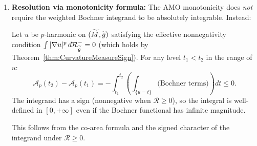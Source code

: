 \begin{enumerate}
\begin{itemize}
        Since $N(0) \ge 1$ for $p$-harmonic functions (with equality only for linear functions), we have $(N(0)-1)p \ge 0$. For generic $p$-harmonic functions with isolated critical points, $N(0) = 2$ (corresponding to quadratic vanishing), giving:
        \begin{equation}
            \text{exponent} = p + 0 = p > 0 > -2 \quad \checkmark
        \end{equation}
        
        For degenerate cases with higher-order vanishing ($N(0) > 2$), the exponent is even more positive.
    \end{itemize}
    
    \item \textbf{Resolution via monotonicity formula:} The AMO monotonicity does \emph{not} require the weighted Bochner integrand to be absolutely integrable. Instead:
    
    \begin{lemma}\label{lem:SignedMono}
    Let $u$ be $p$-harmonic on $(\widetilde{M}, \widetilde{g})$ satisfying the effective nonnegativity condition $\int |\nabla u|^p \, d\mathcal{R}_{\widetilde{g}}^- = 0$ (which holds by Theorem~\ref{thm:CurvatureMeasureSign}). For any level $t_1 < t_2$ in the range of $u$:
    \begin{equation}
        \mathcal{A}_p(t_2) - \mathcal{A}_p(t_1) = -\int_{t_1}^{t_2} \left( \int_{\{u = t\}} \text{(Bochner terms)} \right) dt \le 0.
    \end{equation}
    The integrand has a sign (nonnegative when $\mathcal{R} \ge 0$), so the integral is well-defined in $[0, +\infty]$ even if the Bochner functional has infinite magnitude.
    \end{lemma}
    
    This follows from the co-area formula and the signed character of the integrand under $\mathcal{R} \ge 0$.
    

\end{enumerate}
